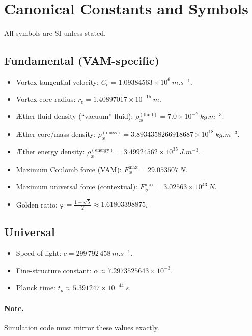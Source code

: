\documentclass[11pt,a4paper]{article}
\begin{document}
    \section{Canonical Constants and Symbols}
    All symbols are SI unless stated.

    \subsection{Fundamental (VAM-specific)}
    \begin{itemize}
        \item Vortex tangential velocity: $C_e = 1.09384563 \times 10^{6}\ \si{m.s^{-1}}$.
        \item Vortex-core radius: $r_c = 1.40897017 \times 10^{-15}\ \si{m}$.
        \item Æther fluid density (``vacuum'' fluid): $\rho_{\text{\ae}}^{(\text{fluid})} = 7.0 \times 10^{-7}\ \si{kg.m^{-3}}$.
        \item Æther core/mass density: $\rho_{\text{\ae}}^{(\text{mass})} = 3.8934358266918687 \times 10^{18}\ \si{kg.m^{-3}}$.
        \item Æther energy density: $\rho_{\text{\ae}}^{(\text{energy})} = 3.49924562 \times 10^{35}\ \si{J.m^{-3}}$.
        \item Maximum Coulomb force (VAM): $F_{\text{\ae}}^{\max} = 29.053507\ \si{N}$.
        \item Maximum universal force (contextual): $F_{\text{gr}}^{\max} = 3.02563 \times 10^{43}\ \si{N}$.
        \item Golden ratio: $\varphi = \frac{1+\sqrt{5}}{2} \approx 1.61803398875$.
    \end{itemize}

    \subsection{Universal}
    \begin{itemize}
        \item Speed of light: $c = 299\,792\,458\ \si{m.s^{-1}}$.
        \item Fine-structure constant: $\alpha \approx 7.2973525643 \times 10^{-3}$.
        \item Planck time: $t_p \approx 5.391247 \times 10^{-44}\ \si{s}$.
    \end{itemize}

    \paragraph{Note.} Simulation code must mirror these values exactly.
\end{document}
